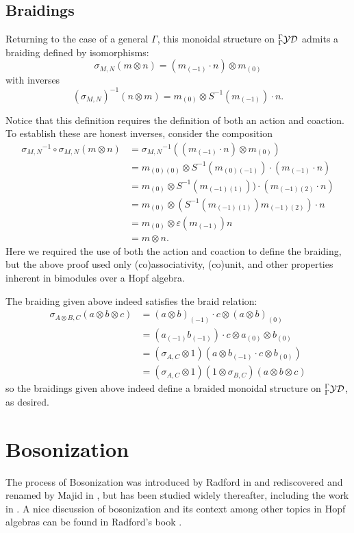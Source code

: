 \documentclass [11pt, proquest] {uwthesis}[2020/02/24]
\begin{document}
\subsection{Braidings}\label{subsubsec:braiding}
    Returning to the case of a general $\Gamma$, this monoidal structure on ${^\Gamma_\Gamma\mathcal{YD}}$ admits a braiding defined by isomorphisms:
    \[\sigma_{M,N}(m\otimes n)=(m_{(-1)}\cdot n)\otimes m_{(0)}\]
    with inverses
    \[(\sigma_{M,N})^{-1}(n\otimes m)=m_{(0)}\otimes S^{-1}(m_{(-1)})\cdot n.\]
    \begin{rmk}
        Notice that this definition requires the definition of both an action and coaction. To establish these are honest inverses, consider the composition
        \begin{align*}
            {\sigma_{M,N}}^{-1}\circ\sigma_{M,N}(m\otimes n) &={\sigma_{M,N}}^{-1}((m_{(-1)}\cdot n)\otimes m_{(0)})\\
            &=m_{(0)(0)}\otimes S^{-1}(m_{(0)(-1)})\cdot(m_{(-1)}\cdot n)\\
            &=m_{(0)}\otimes S^{-1}(m_{(-1)(1)}))\cdot(m_{(-1)(2)}\cdot n)\\
            &=m_{(0)}\otimes (S^{-1}(m_{(-1)(1)})m_{(-1)(2)})\cdot n\\
            &=m_{(0)}\otimes \varepsilon(m_{(-1)})n\\
            &=m\otimes n.
        \end{align*}
        Here we required the use of both the action and coaction to define the braiding, but the above proof used only (co)associativity, (co)unit, and other properties inherent in bimodules over a Hopf algebra.
    \end{rmk}
    
    The braiding given above indeed satisfies the braid relation:
    \begin{align*}
        \sigma_{A\otimes B,C}(a\otimes b\otimes c)&=(a\otimes b)_{(-1)}\cdot c\otimes (a\otimes b)_{(0)}\\
        &=(a_{(-1)}b_{(-1)})\cdot c\otimes a_{(0)}\otimes b_{(0)}\\
        &=(\sigma_{A,C}\otimes 1)(a\otimes b_{(-1)}\cdot c\otimes b_{(0)})\\
        &=(\sigma_{A,C}\otimes 1)(1\otimes\sigma_{B,C})(a\otimes b\otimes c)
    \end{align*}
    so the braidings given above indeed define a braided monoidal structure on ${^\Gamma_\Gamma\mathcal{YD}}$, as desired.

\section{Bosonization}\label{sec:bosonization}
    The process of Bosonization was introduced by Radford in \cite{radford-product} and rediscovered and renamed by Majid in \cite{majid-bosonization}, but has been studied widely thereafter, including the work in \cite{andruskiewitsch-schneider-lifting}. A nice discussion of bosonization and its context among other topics in Hopf algebras can be found in Radford's book \cite[chp. 11]{radford-book}.
\end{document}
